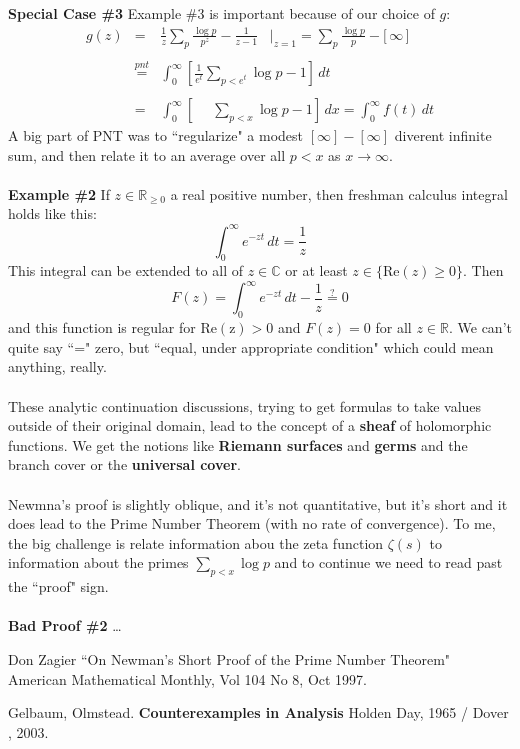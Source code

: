 \documentclass[12pt]{article}
\begin{document}
\noindent \textbf{Special Case \#3} Example \#3 is important because of our choice of $g$:
\begin{eqnarray*} g(z) &=& \frac{1}{z} \sum_p \frac{\log p}{p^z} - \frac{1}{z-1} 
 \;\;\;\Bigg|_{z=1} = \sum_p \frac{\log p}{p} - \big[ \,\infty \,\big] \\ \\
&\stackrel{pnt}{=}& \int_0^\infty \left[ \frac{1}{e^t} \sum_{p < e^t} \log p - 1 \right] \, dt \\ \\
&=& \int_0^\infty \left[\;\;\;\;\,  \sum_{p < x} \log p - 1 \right] \, dx = \int_0^\infty f(t) \, dt\end{eqnarray*}
A big part of PNT was to ``regularize" a modest $[\infty] - [ \infty]$ diverent infinite sum, and then relate it to an average over all $p < x$ as $x \to \infty$. \\ \\
\textbf{Example \#2} If $z \in \mathbb{R}_{\geq 0}$ a real positive number, then freshman calculus integral holds like this:
$$ \int_0^\infty e^{-zt} \, dt = \frac{1}{z} $$
This integral can be extended to all of $z \in \mathbb{C}$ or at least $z \in \{  \mathrm{Re}(z) \geq 0\}$.  Then
$$ F(z) = \int_0^\infty e^{-zt} \, dt - \frac{1}{z}  \stackrel{?}{=} 0 $$
and this function is regular for $\mathrm{Re(z)} > 0$ and $F(z) = 0$ for all $z \in \mathbb{R}$.   We can't quite say ``=" zero, but ``equal, under appropriate condition" which could mean anything, really. \\ \\
These analytic continuation discussions, trying to get formulas to take values outside of their original domain, lead to the concept of a \textbf{sheaf} of holomorphic functions.  We get the notions like \textbf{Riemann surfaces} and \textbf{germs} and the branch cover or the \textbf{universal cover}.  \\ \\
Newmna's proof is slightly oblique, and it's not quantitative, but it's short and it does lead to the Prime Number Theorem (with no rate of convergence).  To me, the big challenge is relate information abou the zeta function $\zeta(s)$ to information about the primes $\sum_{p < x} \log p$ and to continue we need to read past the ``proof" sign. \\ \\
\textbf{Bad Proof \#2} \dots 
\vfill

\begin{thebibliography}{}

\item Don Zagier ``On Newman's Short Proof of the Prime Number Theorem" American Mathematical Monthly, Vol 104 No 8, Oct 1997.

\item Gelbaum, Olmstead. \textbf{Counterexamples in Analysis} Holden Day, 1965 / Dover , 2003.

\end{thebibliography}
\end{document}
